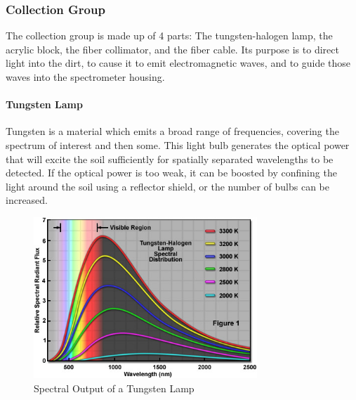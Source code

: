 \subsubsection{Collection Group}

The collection group is made up of 4 parts: The tungsten-halogen lamp, the acrylic block, the fiber collimator, and the fiber cable. Its purpose is to direct light into the dirt, to cause it to emit electromagnetic waves, and to guide those waves into the spectrometer housing.

\paragraph{Tungsten Lamp} Tungsten is a material which emits a broad range of frequencies, covering the spectrum of interest and then some. This light bulb generates the optical power that will excite the soil sufficiently for spatially separated wavelengths to be detected. If the optical power is too weak, it can be boosted by confining the light around the soil using a reflector shield, or the number of bulbs can be increased.

\begin{figure}[H]
    \caption{Spectral Output of a Tungsten Lamp}
    \centering
    \includegraphics[width=0.75\textwidth]{images/TungstenLamp.jpg}
\end{figure}

